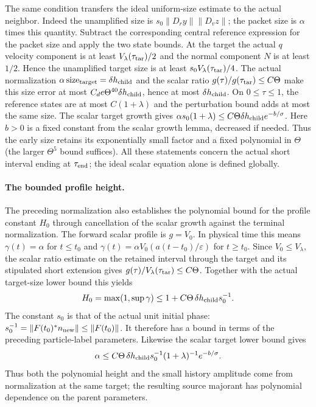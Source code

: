 \documentclass[11pt]{article}
\theoremstyle{definition}
\begin{document}
The same condition transfers the ideal uniform-size estimate to the actual
neighbor. Indeed the unamplified size is
$s_0\|D_ry\|\|D_vz\|$; the packet size is $\alpha$ times this quantity.
Subtract the corresponding central reference expression for the packet
size and apply the two state bounds. At the target the actual $q$ velocity component is at least
$V_\lambda(\tau_{\rm tar})/2$ and the normal component $N$ is at least
$1/2$. Hence the unamplified target size is at least
$s_0V_\lambda(\tau_{\rm tar})/4$.
The actual normalization $\alpha\,\mathrm{size}_{\rm target}
=\delta h_{\rm child}$ and the scalar ratio
$g(\tau)/g(\tau_{\rm tar})\leq C\Theta$ make this size error at most
$C_de\Theta^{40}\delta h_{\rm child}$, hence at most
$\delta h_{\rm child}$.
On $0\leq\tau\leq1$, the reference states are at most $C(1+\lambda)$
and the perturbation bound adds at most the same size.
The scalar target growth gives
$\alpha s_0(1+\lambda)\leq
 C\Theta\delta h_{\rm child}e^{-b/\sigma}$.
Here $b>0$ is a fixed constant from the scalar growth lemma, decreased
if needed. Thus the early size retains its exponentially small factor and a
fixed polynomial in $\Theta$ (the larger $\Theta^5$ bound suffices).
All these statements concern the actual short interval ending at
$\tau_{\rm end}$; the ideal scalar equation alone is defined globally.

\paragraph{The bounded profile height.}
The preceding normalization also establishes the polynomial bound for the
profile constant $H_0$ through cancellation of the scalar growth
against the terminal normalization.
The forward scalar profile is $g=V_0$. In physical time this means
$\gamma(t)=\alpha$ for $t\leq t_0$ and
$\gamma(t)=\alpha V_0(a(t-t_0)/\varepsilon)$ for $t\geq t_0$.
Since $V_0\leq V_\lambda$,
the scalar ratio estimate on the retained interval through the target
and its stipulated short extension gives
$g(\tau)/V_\lambda(\tau_{\rm tar})\leq C\Theta$.
Together with the actual target-size lower bound this yields
\begin{equation}\label{eq:actual-profile-height}
 H_0=\max(1,\sup\gamma)
 \leq1+C\Theta\,\delta h_{\rm child}s_0^{-1}.
\end{equation}
The constant $s_0$ is that of the actual unit initial phase:
$s_0^{-1}=\|F(t_0)^*n_{\rm new}\|\leq\|F(t_0)\|$.
It therefore has a bound in terms of the preceding particle-label parameters.
Likewise the scalar target lower bound gives
\[
 \alpha\leq
 C\Theta\,\delta h_{\rm child}s_0^{-1}
              (1+\lambda)^{-1}e^{-b/\sigma}.
\]
Thus both the polynomial height and the small history amplitude come
from normalization at the same target; the resulting source majorant
has polynomial dependence on the parent parameters.
\end{document}
